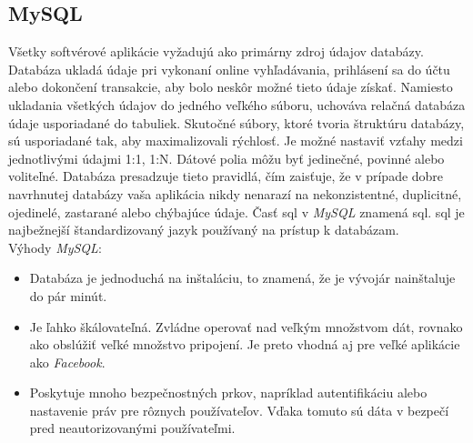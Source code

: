 \subsection{MySQL \label{section:mysql}}
\indent \indent Všetky softvérové aplikácie vyžadujú ako primárny zdroj údajov databázy. Databáza ukladá údaje pri vykonaní online vyhľadávania, prihlásení sa do účtu alebo dokončení transakcie, aby bolo neskôr možné tieto údaje získať. Namiesto ukladania všetkých údajov do jedného veľkého súboru, uchováva relačná databáza údaje usporiadané do tabuliek. Skutočné súbory, ktoré tvoria štruktúru databázy, sú usporiadané tak, aby maximalizovali rýchlosť. Je možné nastaviť vzťahy medzi jednotlivými údajmi 1:1, 1:N. Dátové polia môžu byť jedinečné, povinné alebo voliteľné. Databáza presadzuje tieto pravidlá, čím zaisťuje, že v prípade dobre navrhnutej databázy vaša aplikácia nikdy nenarazí na nekonzistentné, duplicitné, ojedinelé, zastarané alebo chýbajúce údaje. Časť \acrshort{sql} v \textit{MySQL} znamená \acrlong{sql}. \acrshort{sql} je najbežnejší štandardizovaný jazyk používaný na prístup k databázam. \\Výhody \textit{MySQL}\cite{mysql}:
\begin{itemize}
    \item Databáza je jednoduchá na inštaláciu, to znamená, že je vývojár nainštaluje do pár minút.
    \item Je ľahko škálovateľná. Zvládne operovať nad veľkým množstvom dát, rovnako ako obslúžiť veľké množstvo pripojení. Je preto vhodná aj pre veľké aplikácie ako \textit{Facebook}.
    \item Poskytuje mnoho bezpečnostných prkov, napríklad autentifikáciu alebo nastavenie práv pre rôznych používateľov. Vďaka tomuto sú dáta v bezpečí pred neautorizovanými používateľmi.
\end{itemize}


